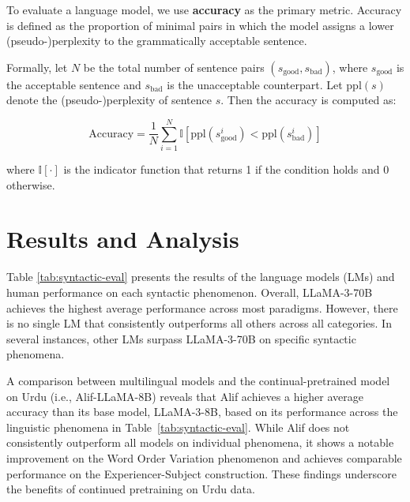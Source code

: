 \documentclass[11pt]{article}
\begin{document}
To evaluate a language model, we use \textbf{accuracy} as the primary metric. Accuracy is defined as the proportion of minimal pairs in which the model assigns a lower (pseudo-)perplexity to the grammatically acceptable sentence.

Formally, let $N$ be the total number of sentence pairs $(s_{\text{good}}, s_{\text{bad}})$, where $s_{\text{good}}$ is the acceptable sentence and $s_{\text{bad}}$ is the unacceptable counterpart. Let $\text{ppl}(s)$ denote the (pseudo-)perplexity of sentence $s$. Then the accuracy is computed as:

\begin{equation*}
\text{Accuracy} = \frac{1}{N} \sum_{i=1}^{N} \mathbb{I} \left[ \text{ppl}(s_{\text{good}}^i) < \text{ppl}(s_{\text{bad}}^i) \right]
\end{equation*}

where $\mathbb{I}[\cdot]$ is the indicator function that returns 1 if the condition holds and 0 otherwise.
\section{Results and Analysis}
Table \ref{tab:syntactic-eval} presents the results of the language models (LMs) and human performance on each syntactic phenomenon. Overall, LLaMA-3-70B achieves the highest average performance across most paradigms. However, there is no single LM that consistently outperforms all others across all categories. In several instances, other LMs surpass LLaMA-3-70B on specific syntactic phenomena.

A comparison between multilingual models and the continual-pretrained model on Urdu (i.e., Alif-LLaMA-8B) reveals that Alif achieves a higher average accuracy than its base model, LLaMA-3-8B, based on its performance across the linguistic phenomena in Table~\ref{tab:syntactic-eval}. While Alif does not consistently outperform all models on individual phenomena, it shows a notable improvement on the Word Order Variation phenomenon and achieves comparable performance on the Experiencer-Subject construction. These findings underscore the benefits of continued pretraining on Urdu data.
\end{document}
